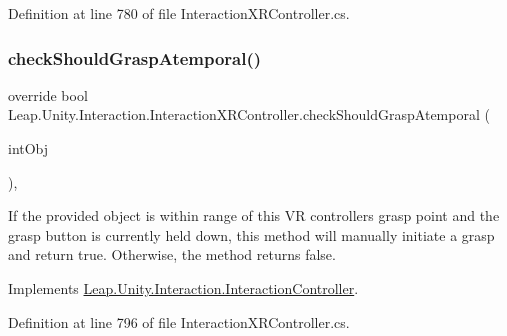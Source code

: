 Definition at line 780 of file Interaction\+X\+R\+Controller.\+cs.

\mbox{\label{class_leap_1_1_unity_1_1_interaction_1_1_interaction_x_r_controller_a4756d119b4d5a13574ed990e439e64f3}} 
\subsubsection{\texorpdfstring{checkShouldGraspAtemporal()}{checkShouldGraspAtemporal()}}
{\footnotesize\ttfamily override bool Leap.\+Unity.\+Interaction.\+Interaction\+X\+R\+Controller.\+check\+Should\+Grasp\+Atemporal (\begin{DoxyParamCaption}\item[{\mbox{\hyperlink{interface_leap_1_1_unity_1_1_interaction_1_1_i_interaction_behaviour}{I\+Interaction\+Behaviour}}}]{int\+Obj }\end{DoxyParamCaption})\hspace{0.3cm}{\ttfamily [protected]}, {\ttfamily [virtual]}}



If the provided object is within range of this VR controller\textquotesingle{}s grasp point and the grasp button is currently held down, this method will manually initiate a grasp and return true. Otherwise, the method returns false. 



Implements \mbox{\hyperlink{class_leap_1_1_unity_1_1_interaction_1_1_interaction_controller_a99f071b469073deb8265da627e90ad0c}{Leap.\+Unity.\+Interaction.\+Interaction\+Controller}}.



Definition at line 796 of file Interaction\+X\+R\+Controller.\+cs.

\mbox{\label{class_leap_1_1_unity_1_1_interaction_1_1_interaction_x_r_controller_a46275014cfc4325621c01097047bb701}} 
